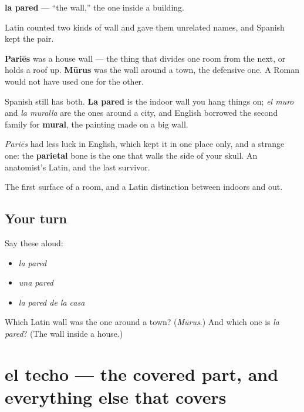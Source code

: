 \begin{cousinweb}
\textbf{la pared} — \textquotedblleft{}the wall,\textquotedblright{} the one inside a building.

Latin counted two kinds of wall and gave them unrelated names, and Spanish kept the pair.

\textbf{Pariēs} was a house wall — the thing that divides one room from the next, or holds a roof up. \textbf{Mūrus} was the wall around a town, the defensive one. A Roman would not have used one for the other.

Spanish still has both. \textbf{La pared} is the indoor wall you hang things on; \emph{el muro} and \emph{la muralla} are the ones around a city, and English borrowed the second family for \textbf{mural}, the painting made on a big wall.

\emph{Pariēs} had less luck in English, which kept it in one place only, and a strange one: the \textbf{parietal} bone is the one that walls the side of your skull. An anatomist's Latin, and the last survivor.
\end{cousinweb}

\begin{grammarlens}[title={What you've built}]
The first surface of a room, and a Latin distinction between indoors and out.
\end{grammarlens}

\subsection*{Your turn}
Say these aloud:

\begin{itemize}
\raggedright
  \item \emph{la pared}
  \item \emph{una pared}
  \item \emph{la pared de la casa}
\end{itemize}

\begin{tcolorbox}[breakable,colback=teal!4,colframe=teal!35!black,title={Before you move on}]
Which Latin wall was the one around a town? (\emph{Mūrus}.) And which one is \emph{la pared}? (The wall inside a house.)
\end{tcolorbox}
\section[el techo]{el techo — the covered part, and everything else that covers}

